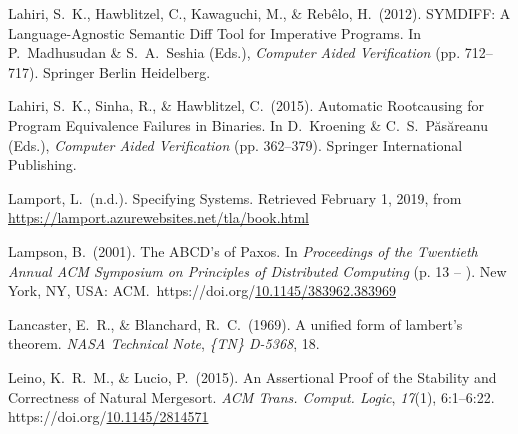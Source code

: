 \documentclass[12pt,twoside]{article}
\begin{document}
{\begin{thebibliography}{222}
Lahiri, S.~K., Hawblitzel, C., Kawaguchi, M., \& Rebêlo, H.~(2012). SYMDIFF: A Language-Agnostic Semantic Diff Tool for Imperative Programs. In P.~Madhusudan \& S.~A.~Seshia (Eds.), \emph{Computer Aided Verification} (pp. 712–717). Springer Berlin Heidelberg.\label{lahiri_symdiff:_2012}%

Lahiri, S.~K., Sinha, R., \& Hawblitzel, C.~(2015). Automatic Rootcausing for Program Equivalence Failures in Binaries. In D.~Kroening \& C.~S.~Păsăreanu (Eds.), \emph{Computer Aided Verification} (pp. 362–379). Springer International Publishing.\label{lahiri_automatic_2015}%

\mdbibitemlabel{[Lamport, n.d.]}Lamport, L.~(n.d.). Specifying Systems. Retrieved February 1, 2019, from \href{https://lamport.azurewebsites.net/tla/book.html}{{\ttfamily https://\hspace{0pt}lamport.\hspace{0pt}azurewebsites.\hspace{0pt}net/\hspace{0pt}tla/\hspace{0pt}book.\hspace{0pt}html}}\label{lamport_specifying_nodate}%

\mdbibitemlabel{[Lampson, 2001]}Lampson, B.~(2001). The ABCD’s of Paxos. In \emph{Proceedings of the Twentieth Annual ACM Symposium on Principles of Distributed Computing} (p. 13 – ). New York, NY, USA: ACM.~https://doi.org/\href{https://dx.doi.org/10.1145/383962.383969}{10.1145/383962.383969}\label{lampson_abcds_2001}%

Lancaster, E.~R., \& Blanchard, R.~C.~(1969). A unified form of lambert’s theorem. \emph{NASA Technical Note}, \emph{\{TN\} D-5368}, 18.\label{lancaster_unified_1969}%

Leino, K.~R.~M., \& Lucio, P.~(2015). An Assertional Proof of the Stability and Correctness of Natural Mergesort. \emph{ACM Trans. Comput. Logic}, \emph{17}(1), 6:1–6:22. https://doi.org/\href{https://dx.doi.org/10.1145/2814571}{10.1145/2814571}\label{leino_assertional_2015}%


\end{thebibliography}}
\end{document}
